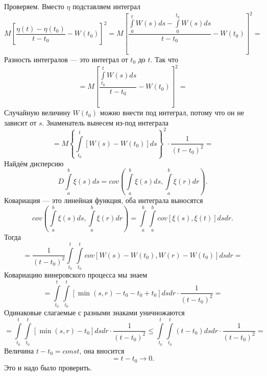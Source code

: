 Проверяем.
Вместо $ \eta $ подставляем интеграл
$$M \left[
    \frac{ \eta \left( t \right) - \eta \left( t_0 \right) }{t - t_0} - W \left( t_0 \right)
  \right]^2 =
  M \left[
    \frac{ \int \limits_0^t W \left( s \right) ds - \int \limits_0^{t_0} W \left( s \right) ds}{t - t_0} -
    W \left( t_0 \right)
  \right]^2 =$$
Разность интегралов --- это интеграл от $t_0$ до $t$.
Так что
$$= M \left[
    \frac{\int \limits_{t_0}^t W \left( s \right) ds}{t - t_0} - W \left( t_0 \right)
  \right]^2 =$$
Случайную величину $W \left( t_0 \right) $ можно внести под интеграл,
потому что он не зависит от $s$.
Знаменатель вынесем из-под интеграла
$$= M \left\{
    \int \limits_{t_0}^t \left[
      W \left( s \right) - W \left( t_0 \right)
    \right] ds
  \right\}^2 \cdot
  \frac{1}{ \left( t - t_0 \right)^2} =$$
Найдём дисперсию
$$D \int \limits_a^b \xi \left( s \right) ds =
  cov \left(
    \int \limits_a^b \xi \left( s \right) ds, \int \limits_a^b \xi \left( r \right) dr
  \right).$$
Ковариация --- это линейная функция, оба интеграла выносятся
$$cov \left(
    \int \limits_a^b \xi \left( s \right) ds, \int \limits_a^b \xi \left( r \right) dr
  \right) =
  \int \limits_a^b \int \limits_a^b
    cov \left[ \xi \left( s \right), \xi \left( t \right) \right]
  dsdr.$$
Тогда
$$= \frac{1}{ \left( t - t_0 \right)^2} \int \limits_{t_0}^t \int \limits_{t_0}^t cov \left[
    W \left( s \right) - W \left( t_0 \right), W \left( r \right) - W \left( t_0 \right) \right]
  dsdr =$$
Ковариацию винеровского процесса мы знаем
$$= \int \limits_{t_0}^t \int \limits_{t_0}^t \left[
    \min \left( s, r \right) - t_0 - t_0 + t_0 \right] dsdr \cdot
  \frac{1}{ \left( t - t_0 \right)^2} =$$
Одинаковые слагаемые с разными знаками уничножаются
$$= \int \limits_{t_0}^t \int \limits_{t_0}^t
    \left[ \min \left( s, r \right) - t_0 \right] dsdr \cdot
  \frac{1}{ \left( t - t_0 \right)^2} \leq
  \int \limits_{t_0}^t \int \limits_{t_0}^t \left( t - t_0 \right) dsdr \cdot
  \frac{1}{ \left( t - t_0 \right)^2} =$$
Величина $t - t_0 = const$, она вносится
$$= t - t_0 \to
  0.$$
Это и надо было проверить.
